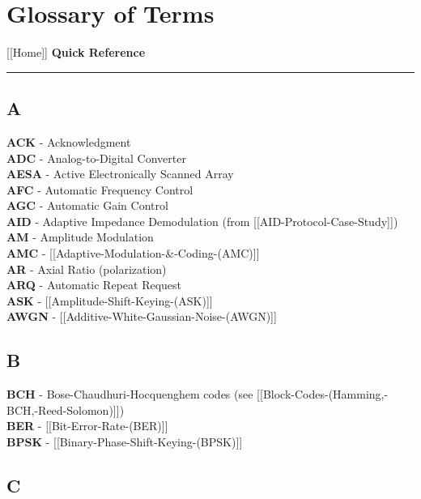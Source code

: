 \section{Glossary of Terms}\label{glossary-of-terms}

{[}{[}Home{]}{]} \textbar{} \textbf{Quick Reference}

\begin{center}\rule{0.5\linewidth}{0.5pt}\end{center}

\subsection{A}\label{a}

\textbf{ACK} - Acknowledgment\\
\textbf{ADC} - Analog-to-Digital Converter\\
\textbf{AESA} - Active Electronically Scanned Array\\
\textbf{AFC} - Automatic Frequency Control\\
\textbf{AGC} - Automatic Gain Control\\
\textbf{AID} - Adaptive Impedance Demodulation (from
{[}{[}AID-Protocol-Case-Study{]}{]})\\
\textbf{AM} - Amplitude Modulation\\
\textbf{AMC} - {[}{[}Adaptive-Modulation-\&-Coding-(AMC){]}{]}\\
\textbf{AR} - Axial Ratio (polarization)\\
\textbf{ARQ} - Automatic Repeat Request\\
\textbf{ASK} - {[}{[}Amplitude-Shift-Keying-(ASK){]}{]}\\
\textbf{AWGN} - {[}{[}Additive-White-Gaussian-Noise-(AWGN){]}{]}

\subsection{B}\label{b}

\textbf{BCH} - Bose-Chaudhuri-Hocquenghem codes (see
{[}{[}Block-Codes-(Hamming,-BCH,-Reed-Solomon){]}{]})\\
\textbf{BER} - {[}{[}Bit-Error-Rate-(BER){]}{]}\\
\textbf{BPSK} - {[}{[}Binary-Phase-Shift-Keying-(BPSK){]}{]}

\subsection{C}\label{c}

